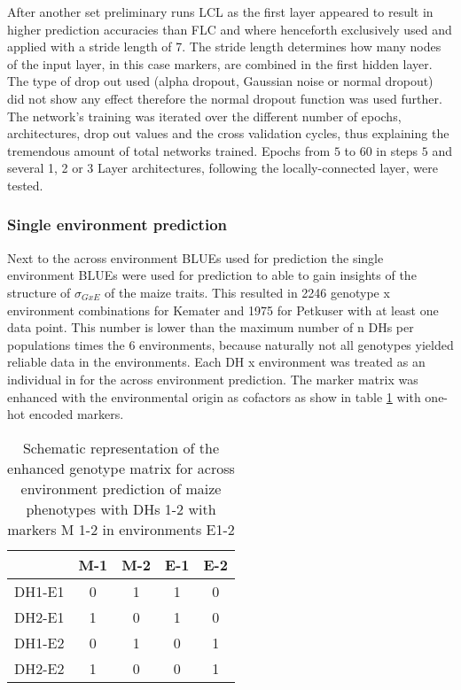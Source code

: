 After another set preliminary runs LCL as the first layer appeared to result in higher
prediction accuracies than FLC and where henceforth exclusively used and applied with a
stride length of 7. The stride length determines how many nodes of the input layer, in
this case markers, are combined in the first hidden layer. The type of drop out used
(alpha dropout, Gaussian noise or normal dropout) did not show any effect therefore the
normal dropout function was used further. The network's training was iterated over the
different number of epochs, architectures, drop out values and the cross validation
cycles, thus explaining the tremendous amount of total networks trained. Epochs from $5$
to $60$ in steps $5$ and several 1, 2 or 3 Layer architectures, following the
locally-connected layer, were tested.

\subsubsection{Single environment prediction}
Next to the across environment BLUEs used for prediction the single environment BLUEs were
used for prediction to able to gain insights of the structure of $\sigma_{GxE}$ of the
maize traits. This resulted in 2246 genotype x environment combinations for Kemater and
1975 for Petkuser with at least one data point. This number is lower than the maximum
number of n DHs per populations times the 6 environments, because naturally not all
genotypes yielded reliable data in the environments. Each DH x environment was treated as
an individual in for the across environment prediction. The marker matrix was enhanced
with the environmental origin as cofactors as show in table \ref{tab:envmarker} with
one-hot encoded markers.

\onehalfspacing
\begin{table}[H]
 \centering
 \caption{Schematic representation of the enhanced genotype matrix for across environment prediction of maize phenotypes with DHs 1-2 with markers M 1-2 in environments E1-2}
 \label{tab:envmarker}
 \begin{tabular}{l|cccc}
  \toprule
      & M-1 & M-2 & E-1 & E-2 \\
  \midrule
  DH1-E1 & 0  & 1  & 1  & 0  \\
  DH2-E1 & 1  & 0  & 1  & 0  \\
  DH1-E2 & 0  & 1  & 0  & 1  \\
  DH2-E2 & 1  & 0  & 0  & 1  \\                      
  \bottomrule
 \end{tabular}
\end{table}
\doublespacing

